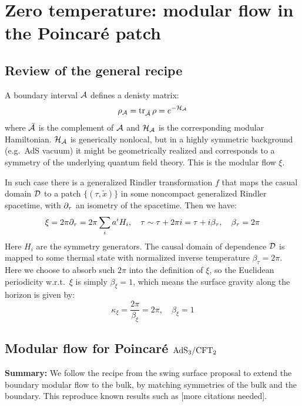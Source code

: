 \documentclass[11pt,a4paper]{article}
\begin{document}
	
\pagebreak

\section{Zero temperature: modular flow in the Poincar\'e patch}
	
\subsection{Review of the general recipe}
	A boundary interval $\mathcal{A}$ defines a denisty matrix:
	\begin{equation}
		\rho_{\mathcal{A}}
		= \operatorname{tr}_{\bar{\mathcal{A}}} \rho
		= e^{-\mathcal{H}_{\mathcal{A}}}
	\end{equation}
	where $\bar{\mathcal{A}}$ is the complement of $\mathcal{A}$ and $\mathcal{H}_{\mathcal{A}}$ is the corresponding modular Hamiltonian. $\mathcal{H}_{\mathcal{A}}$ is generically nonlocal, but in a highly symmetric background (e.g.~AdS vacuum) it might be geometrically realized and corresponds to a symmetry of the underlying quantum field theory. This is the modular flow $\xi$. 
	
	In such case there is a generalized Rindler transformation $f$ that maps the casual domain $\mathcal{D}$ to a patch $\{(\tau,\tilde{x})\}$ in some noncompact generalized Rindler spacetime, with $\partial_{\tau}$ an isometry of the spacetime. Then we have:
	\begin{equation}
		\xi = 2\pi \partial_{\tau}
		= 2\pi \sum_i a^i H_i,
	\quad
		\tau \sim \tau + 2\pi i
		= \tau + i\beta_\tau,
	\quad
		\beta_\tau = 2\pi
	\end{equation}
	Here $H_i$ are the symmetry generators. The causal domain of dependence $\mathcal{D}$ is mapped to some thermal state with normalized inverse temperature $\beta_\tau = 2\pi$. Here we choose to absorb such $2\pi$ into the definition of $\xi$, so the Euclidean periodicity w.r.t.~$\xi$ is simply $\beta_\xi = 1$, which means the surface gravity along the horizon is given by:
	\begin{equation}
		\kappa_\xi = \frac{2\pi}{\beta_\xi} = 2\pi,
	\quad
		\beta_\xi = 1
	\end{equation}

\pagebreak

\subsection{Modular flow for Poincar\'e $\mathrm{AdS}_3/\mathrm{CFT}_2$}

\textbf{Summary:} We follow the recipe from the swing surface proposal \cite{Apolo:2020bld,Apolo:2020qjm} to extend the boundary modular flow to the bulk, by matching symmetries of the bulk and the boundary. This reproduce known results such as \cite{Lashkari:2016idm,Czech:2019vih,Apolo:2020qjm} [more citations needed].
\end{document}
